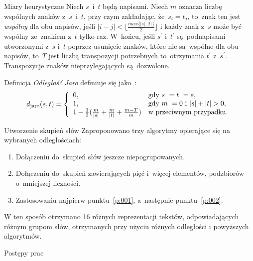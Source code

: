 \documentclass[11pt,pdftex,mathserif]{beamer}
\theoremstyle{definition}
\begin{document}
\begin{frame}{Miary heurystyczne}
Niech $s$~i~$t$ będą napisami. Niech $m$ oznacza liczbę wspólnych znaków z~$s$~i~$t$, przy czym zakładając, że~$s_i = t_j$, to~znak ten jest \emph{wspólny} dla obu napisów, jeśli $ |i -j| < \lfloor\frac{max\{|s|, |t|\}}{2}\rfloor$
i każdy znak z~$s$ może być wspólny ze~znakiem z~$t$ tylko raz. W~końcu, jeśli $s^\prime$ i~$t^\prime$ są~podnapisami utworzonymi z~$s$ i~$t$ poprzez usunięcie znaków, które nie są~wspólne dla obu napisów, to~$T$ jest liczbą transpozycji potrzebnych to~otrzymania $t^\prime$ z~$s^\prime$. Transpozycje znaków nieprzylegających są~dozwolone.
\begin{block}{Definicja}
\emph{Odległość Jaro} definiuje się jako~\cite{Loo2014:stringdist}:
\begin{equation*}
\label{eq:011}
d_{\mathrm{jaro}}(s,t) = \left\{
\begin{array}{l l}     
    0, & \text{gdy } s~= t~= \varepsilon, \\
    1, & \text{gdy } m~= 0 \text{ i~} |s| + |t| > 0, \\
    1 - \frac{1}{3} (\frac{m}{|s|} + \frac{m}{|t|} + \frac{m - T}{m}) & \text{w przeciwnym przypadku}.
\end{array}\right.
\end{equation*}
\end{block}
\end{frame}

\begin{frame}{Utworzenie skupień słów}
Zaproponowano trzy algorytmy opierające się na wybranych odległościach:
\begin{enumerate}
\item\label{p:001} Dołączeniu do~skupień słów jeszcze niepogrupowanych.
\item\label{p:002} Dołączeniu do~skupień zawierających pięć i~więcej elementów, podzbiorów o~mniejszej liczności.
\item Zastosowaniu najpierw punktu~\ref{p:001}, a~następnie punktu~\ref{p:002}.
\end{enumerate}
\pause
W ten sposób otrzymano 16 różnych reprezentacji tekstów, odpowiadających różnym grupom słów, otrzymanych przy użyciu różnych odległości i powyższych algorytmów.
\end{frame}



\begin{frame}{Postępy prac}

\end{frame}
\end{document}
